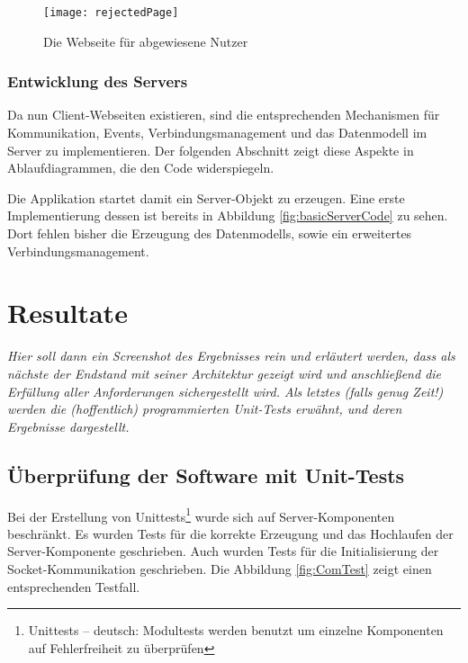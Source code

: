 \begin{figure}[htp]
	\centering
	\captionsetup{justification=centering}
	\texttt{[image: rejectedPage]}
	\caption[Webseite Abweisung]{Die Webseite für abgewiesene Nutzer}
	\label{fig:rejectedPage}
\end{figure}

\subsubsection{Entwicklung des Servers}

Da nun Client-Webseiten existieren, sind die entsprechenden Mechanismen für Kommunikation, Events, Verbindungsmanagement und das Datenmodell im Server zu implementieren. Der folgenden Abschnitt zeigt diese Aspekte in Ablaufdiagrammen, die den Code widerspiegeln.

Die Applikation startet damit ein Server-Objekt zu erzeugen. Eine erste Implementierung dessen ist bereits in Abbildung \ref{fig:basicServerCode} zu sehen. Dort fehlen bisher die Erzeugung des Datenmodells, sowie ein erweitertes Verbindungsmanagement.\\


\section{Resultate}
\label{sec:Resultate}

\emph{Hier soll dann ein Screenshot des Ergebnisses rein und erläutert werden, dass als nächste der Endstand mit seiner Architektur gezeigt wird und anschließend die Erfüllung aller Anforderungen sichergestellt wird. Als letztes (falls genug Zeit!) werden die (hoffentlich) programmierten Unit-Tests erwähnt, und deren Ergebnisse dargestellt.}

\subsection{Überprüfung der Software mit Unit-Tests}
\label{subsec:unittests}

Bei der Erstellung von Unittests\footnote{Unittests -- deutsch: Modultests werden benutzt um einzelne Komponenten auf Fehlerfreiheit zu überprüfen} wurde sich auf Server-Komponenten beschränkt. Es wurden Tests für die korrekte Erzeugung und das Hochlaufen der Server-Komponente geschrieben. Auch wurden Tests für die Initialisierung der Socket-Kommunikation geschrieben. Die Abbildung \ref{fig:ComTest} zeigt einen entsprechenden Testfall.


